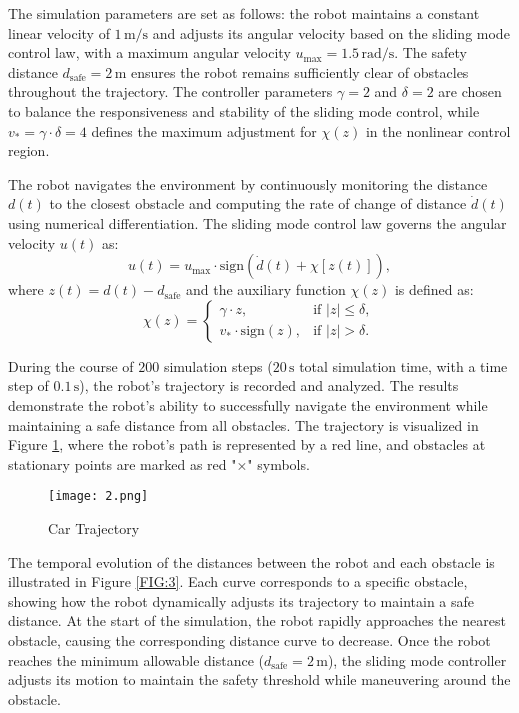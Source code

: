 The simulation parameters are set as follows: the robot maintains a constant linear velocity of \(1\,\text{m/s}\) and adjusts its angular velocity based on the sliding mode control law, with a maximum angular velocity \(u_{\text{max}} = 1.5\,\text{rad/s}\). The safety distance \(d_{\text{safe}} = 2\,\text{m}\) ensures the robot remains sufficiently clear of obstacles throughout the trajectory. The controller parameters \(\gamma = 2\) and \(\delta = 2\) are chosen to balance the responsiveness and stability of the sliding mode control, while \(v_\ast = \gamma \cdot \delta = 4\) defines the maximum adjustment for \(\chi(z)\) in the nonlinear control region.

The robot navigates the environment by continuously monitoring the distance \(d(t)\) to the closest obstacle and computing the rate of change of distance \(\dot{d}(t)\) using numerical differentiation. The sliding mode control law governs the angular velocity \(u(t)\) as:
\begin{equation}
u(t) = u_{\text{max}} \cdot \text{sign} \left( \dot{d}(t) + \chi[z(t)] \right),
\end{equation}
where \(z(t) = d(t) - d_{\text{safe}}\) and the auxiliary function \(\chi(z)\) is defined as:
\begin{equation}
\chi(z) =
\begin{cases}
\gamma \cdot z, & \text{if } |z| \leq \delta, \\
v_\ast \cdot \text{sign}(z), & \text{if } |z| > \delta.
\end{cases}
\end{equation}

During the course of \(200\) simulation steps (\(20\,\text{s}\) total simulation time, with a time step of \(0.1\,\text{s}\)), the robot's trajectory is recorded and analyzed. The results demonstrate the robot's ability to successfully navigate the environment while maintaining a safe distance from all obstacles. The trajectory is visualized in Figure \ref{FIG:2}, where the robot's path is represented by a red line, and obstacles at stationary points are marked as red "×" symbols.

\begin{figure}[H]
    \centering
    \texttt{[image: 2.png]}
    \caption{Car Trajectory} %
    \label{FIG:2}
\end{figure}

The temporal evolution of the distances between the robot and each obstacle is illustrated in Figure \ref{FIG:3}. Each curve corresponds to a specific obstacle, showing how the robot dynamically adjusts its trajectory to maintain a safe distance. At the start of the simulation, the robot rapidly approaches the nearest obstacle, causing the corresponding distance curve to decrease. Once the robot reaches the minimum allowable distance (\(d_{\text{safe}} = 2 \, \text{m}\)), the sliding mode controller adjusts its motion to maintain the safety threshold while maneuvering around the obstacle.

